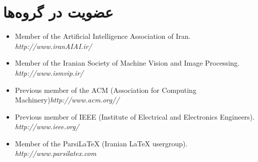 \documentclass[11pt,a4paper]{bidimoderncv}
\begin{document}
\section{عضویت در گروه‌ها}
\begin{latin}
\small
\begin{itemize}%
\item Member of the Artificial Intelligence Association of Iran.	\hfill {\scriptsize\em http://www.iranAIAI.ir/}
\item Member of the Iranian Society of Machine Vision and Image Processing.	\hfill {\scriptsize\em http://www.ismvip.ir/}
\item Previous member of the ACM (Association for Computing Machinery)\hfill {\scriptsize\em http://www.acm.org//}
\item Previous member of IEEE (Institute of Electrical and Electronics Engineers). \hfill {\scriptsize\em http://www.ieee.org/}
\item Member of the ParsiLaTeX (Iranian \LaTeX{} usergroup). \hfill {\scriptsize\em http://www.parsilatex.com}
\end{itemize}	

\end{latin}
\end{document}
